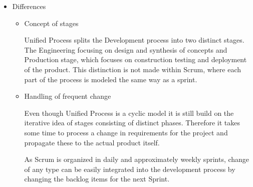 \documentclass[a4paper, 10pt]{article}
\begin{document}
\begin{enumerate}
\begin{itemize}
        \item Differences
        \begin{itemize}
            \item Concept of stages

            Unified Process splits the Development process into two distinct stages. The Engineering focusing on design and synthesis of concepts 
            and Production stage, which focuses on construction testing and deployment of the product. 
            This distinction is not made within Scrum, where each part of the process is modeled the same way as a sprint.
            \item Handling of frequent change

            Even though Unified Process is a cyclic model it is still build on the iterative idea of stages consisting of distinct phases. 
            Therefore it takes some time to process a change in requirements for the project and propagate these to the actual product itself.

            As Scrum is organized in daily and approximately weekly sprints, change of any type can be easily integrated into the development process 
            by changing the backlog items for the next Sprint. 
        \end{itemize}
    \end{itemize}
\end{enumerate}
\end{document}
